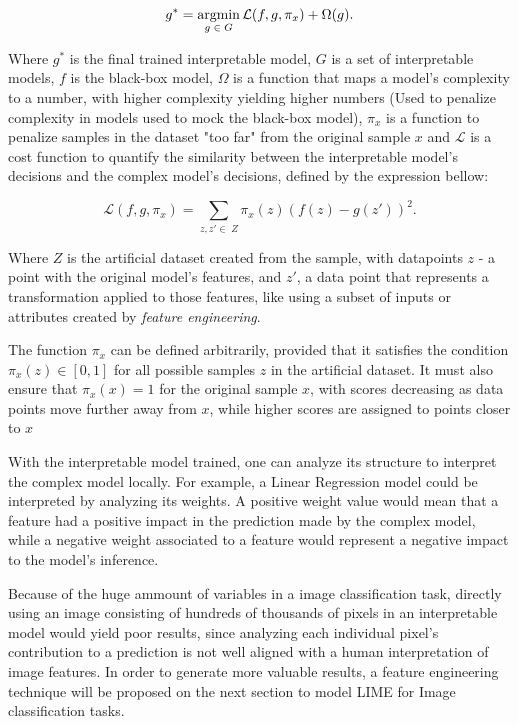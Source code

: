 \begin{equation}
    g^* = \operatorname*{argmin}_{g \;\in\; G} \mathcal{L}(f, g, \pi_x) + \Omega(g).
    \label{eq:lime_optimization}  
\end{equation}

Where \(g^*\) is the final trained interpretable model, 
\(G\) is a set of interpretable models, \(f\) is the black-box model, 
\(\Omega\) is a function that maps a model's complexity to a number, with higher complexity yielding higher numbers (Used to penalize complexity in models used to mock the black-box model),
\(\pi_x\) is a function to penalize samples in the dataset "too far" from the original sample \(x\) and
\(\mathcal{L}\) is a cost function to quantify the similarity between the interpretable model's decisions and the complex model's decisions, defined by the expression bellow:

\begin{equation}
    \mathcal{L}(f, g, \pi_x) = \sum_{z, z' \in \; Z} \pi_x(z) (f(z) - g(z'))^2.
    \label{eq:lime_loss}  
\end{equation}

Where \(Z\) is the artificial dataset created from the sample, with datapoints \(z\) - a point with the original model's features, and \(z'\), a data point that represents a transformation applied to those features, like using a subset of inputs or attributes created by \emph{feature engineering}.

The function \(\pi_x\) can be defined arbitrarily, provided that it satisfies the condition \(\pi_x(z) \in [0, 1]\) for all possible samples \(z\) in the artificial dataset. 
It must also ensure that \(\pi_x(x) = 1\) for the original sample \(x\), with scores decreasing as data points move further away from \(x\), while higher scores are assigned to points closer to \(x\)

With the interpretable model trained, one can analyze its structure to interpret the complex model locally.
For example, a Linear Regression model could be interpreted by analyzing its weights. 
A positive weight value would mean that a feature had a positive impact in the prediction made by the complex model, while a negative weight associated to a feature would represent a negative impact to the model's inference. 

Because of the huge ammount of variables in a image classification task, directly using an image consisting of hundreds of thousands of pixels in an interpretable model would yield poor results, since analyzing each individual pixel's contribution to a prediction is not well aligned with a human interpretation of image features.
In order to generate more valuable results, a feature engineering technique will be proposed on the next section to model LIME for Image classification tasks. 

